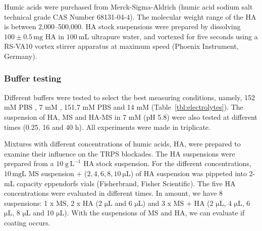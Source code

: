 \documentclass[journal=langd5,manuscript=article]{achemso}
\begin{document}
Humic acids were purchased from Merck-Sigma-Aldrich (humic acid sodium salt technical grade CAS Number 68131-04-4). The molecular weight range of the HA is between  2,000--500,000. HA stock suspensions were prepared by dissolving  $\mathrm{100 \pm 0.5\,mg}$ HA in $100~\mathrm{mL}$ ultrapure water, and vortexed for five seconds using a RS-VA10 vortex stirrer apparatus at maximum speed (Phoenix Instrument, Germany). 


\subsubsection{Buffer testing}
Different buffers were tested to select the best measuring conditions, namely, 
152 mM PBS ,
7 mM , 151.7 mM PBS
and 
14 mM  (Table~\ref{tbl:electrolytes}). The suspension of HA, MS and HA-MS in 7 mM  (pH  5.8) were also tested at different times (0.25, 16 and 40 h). All experiments were made in triplicate.


Mixtures  with different concentrations of humic acids, HA, were prepared to examine their influence on the TRPS blockades. The HA suspensions were prepared from a 
$\mathrm{10\;g\, L^{-1}}$
HA stock suspension. For the different concentrations,  $\mathrm{10\, mg L}$ MS suspension + 
($2, 4, 6, 8, 10~\mathrm{\mu L}$) 
of HA suspension was pippeted into 2-mL capacity eppendorfs vials (Fisherbrand, Fisher Scientific).
The five HA concentrations were evaluated in different times. In amount, we have 8 suspensions: 1 x MS, 2 x HA (2 $\mathrm{\mu L}$ and 6 $\mathrm{\mu L}$) and 3 x MS + HA (2 $\mathrm{\mu L}$, 4 $\mathrm{\mu L}$, 6 $\mathrm{\mu L}$, 8 $\mathrm{\mu L}$ and 10 $\mathrm{\mu L}$). With the suspensions of MS and HA, we can evaluate if coating occurs.

\end{document}
